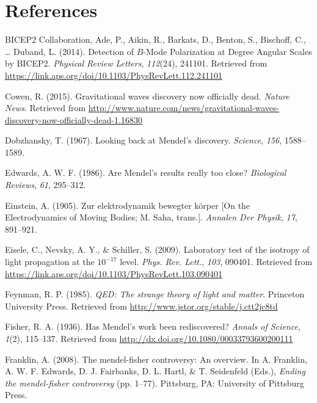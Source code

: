 \documentclass[english,floatsintext,man]{apa6}
\theoremstyle{definition}
\theoremstyle{definition}
\theoremstyle{definition}
\theoremstyle{remark}
\begin{document}
\newpage

\section{References}\label{references}

\setlength{\parindent}{-0.5in} \setlength{\leftskip}{0.5in}

\hypertarget{refs}{}
\hypertarget{ref-BICEP2:2014}{}
BICEP2 Collaboration, Ade, P., Aikin, R., Barkats, D., Benton, S.,
Bischoff, C., \ldots{} Duband, L. (2014). Detection of \({B}\)-Mode
Polarization at Degree Angular Scales by BICEP2. \emph{Physical Review
Letters}, \emph{112}(24), 241101. Retrieved from
\url{https://link.aps.org/doi/10.1103/PhysRevLett.112.241101}

\hypertarget{ref-Cowen:2015}{}
Cowen, R. (2015). Gravitational waves discovery now officially dead.
\emph{Nature News}. Retrieved from
\url{http://www.nature.com/news/gravitational-waves-discovery-now-officially-dead-1.16830}

\hypertarget{ref-Dobzhansky:1967}{}
Dobzhansky, T. (1967). Looking back at Mendel's discovery.
\emph{Science}, \emph{156}, 1588--1589.

\hypertarget{ref-Edwards:1986}{}
Edwards, A. W. F. (1986). Are Mendel's results really too close?
\emph{Biological Reviews}, \emph{61}, 295--312.

\hypertarget{ref-Einstein:1905}{}
Einstein, A. (1905). Zur elektrodynamik bewegter körper {[}On the
Electrodynamics of Moving Bodies; M. Saha, trans.{]}. \emph{Annalen Der
Physik}, \emph{17}, 891--921.

\hypertarget{ref-Eisele:etal:2009}{}
Eisele, C., Nevsky, A. Y., \& Schiller, S. (2009). Laboratory test of
the isotropy of light propagation at the \(10^{-17}\) level. \emph{Phys.
Rev. Lett.}, \emph{103}, 090401. Retrieved from
\url{https://link.aps.org/doi/10.1103/PhysRevLett.103.090401}

\hypertarget{ref-Feynman:1985}{}
Feynman, R. P. (1985). \emph{QED: The strange theory of light and
matter}. Princeton University Press. Retrieved from
\url{http://www.jstor.org/stable/j.ctt2jc8td}

\hypertarget{ref-Fisher:1936}{}
Fisher, R. A. (1936). Has Mendel's work been rediscovered? \emph{Annals
of Science}, \emph{1}(2), 115--137. Retrieved from
\url{http://dx.doi.org/10.1080/00033793600200111}

\hypertarget{ref-Franklin:2008}{}
Franklin, A. (2008). The mendel-fisher controversy: An overview. In A.
Franklin, A. W. F. Edwards, D. J. Fairbanks, D. L. Hartl, \& T.
Seidenfeld (Eds.), \emph{Ending the mendel-fisher controversy} (pp.
1--77). Pittsburg, PA: University of Pittsburg Press.
\end{document}
